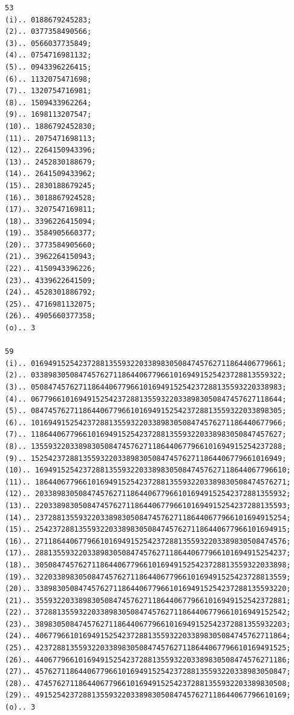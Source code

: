 \documentclass[10pt,a4paper]{article}
\begin{document}
\begin{verbatim}
53
(i).. 0188679245283;
(2).. 0377358490566;
(3).. 0566037735849;
(4).. 0754716981132;
(5).. 0943396226415;
(6).. 1132075471698;
(7).. 1320754716981;
(8).. 1509433962264;
(9).. 1698113207547;
(10).. 1886792452830;
(11).. 2075471698113;
(12).. 2264150943396;
(13).. 2452830188679;
(14).. 2641509433962;
(15).. 2830188679245;
(16).. 3018867924528;
(17).. 3207547169811;
(18).. 3396226415094;
(19).. 3584905660377;
(20).. 3773584905660;
(21).. 3962264150943;
(22).. 4150943396226;
(23).. 4339622641509;
(24).. 4528301886792;
(25).. 4716981132075;
(26).. 4905660377358;
(o).. 3

59
(i).. 0169491525423728813559322033898305084745762711864406779661;
(2).. 0338983050847457627118644067796610169491525423728813559322;
(3).. 0508474576271186440677966101694915254237288135593220338983;
(4).. 0677966101694915254237288135593220338983050847457627118644;
(5).. 0847457627118644067796610169491525423728813559322033898305;
(6).. 1016949152542372881355932203389830508474576271186440677966;
(7).. 1186440677966101694915254237288135593220338983050847457627;
(8).. 1355932203389830508474576271186440677966101694915254237288;
(9).. 1525423728813559322033898305084745762711864406779661016949;
(10).. 1694915254237288135593220338983050847457627118644067796610;
(11).. 1864406779661016949152542372881355932203389830508474576271;
(12).. 2033898305084745762711864406779661016949152542372881355932;
(13).. 2203389830508474576271186440677966101694915254237288135593;
(14).. 2372881355932203389830508474576271186440677966101694915254;
(15).. 2542372881355932203389830508474576271186440677966101694915;
(16).. 2711864406779661016949152542372881355932203389830508474576;
(17).. 2881355932203389830508474576271186440677966101694915254237;
(18).. 3050847457627118644067796610169491525423728813559322033898;
(19).. 3220338983050847457627118644067796610169491525423728813559;
(20).. 3389830508474576271186440677966101694915254237288135593220;
(21).. 3559322033898305084745762711864406779661016949152542372881;
(22).. 3728813559322033898305084745762711864406779661016949152542;
(23).. 3898305084745762711864406779661016949152542372881355932203;
(24).. 4067796610169491525423728813559322033898305084745762711864;
(25).. 4237288135593220338983050847457627118644067796610169491525;
(26).. 4406779661016949152542372881355932203389830508474576271186;
(27).. 4576271186440677966101694915254237288135593220338983050847;
(28).. 4745762711864406779661016949152542372881355932203389830508;
(29).. 4915254237288135593220338983050847457627118644067796610169;
(o).. 3
\end{verbatim}
\end{document}
